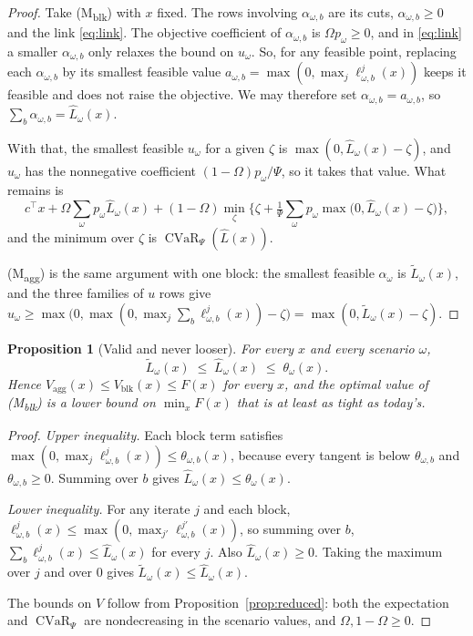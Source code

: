 \documentclass[11pt]{article}
\newtheorem{proposition}{Proposition}
\theoremstyle{remark}
\newcommand{\Lh}{\widehat{L}}
\newcommand{\Lt}{\widetilde{L}}
\newcommand{\CVaR}{\operatorname{CVaR}}
\begin{document}
\begin{proof}
Take (M\textsubscript{blk}) with $x$ fixed. The rows involving $\alpha_{\omega,b}$ are its cuts,
$\alpha_{\omega,b} \ge 0$ and the link \eqref{eq:link}. The objective coefficient of
$\alpha_{\omega,b}$ is $\Omega p_\omega \ge 0$, and in \eqref{eq:link} a smaller $\alpha_{\omega,b}$
only relaxes the bound on $u_\omega$. So, for any feasible point, replacing each $\alpha_{\omega,b}$
by its smallest feasible value $a_{\omega,b} = \max(0, \max_j \ell^j_{\omega,b}(x))$ keeps it
feasible and does not raise the objective. We may therefore set $\alpha_{\omega,b} = a_{\omega,b}$,
so $\sum_b \alpha_{\omega,b} = \Lh_\omega(x)$.

With that, the smallest feasible $u_\omega$ for a given $\zeta$ is
$\max(0, \Lh_\omega(x) - \zeta)$, and $u_\omega$ has the nonnegative coefficient
$(1-\Omega)p_\omega/\Psi$, so it takes that value. What remains is
\[
  c^\top x + \Omega\sum_\omega p_\omega \Lh_\omega(x)
  + (1-\Omega)\min_\zeta\Big\{\zeta + \tfrac1\Psi \sum_\omega p_\omega \max\big(0, \Lh_\omega(x)-\zeta\big)\Big\},
\]
and the minimum over $\zeta$ is $\CVaR_\Psi(\Lh(x))$.

(M\textsubscript{agg}) is the same argument with one block: the smallest feasible $\alpha_\omega$ is
$\Lt_\omega(x)$, and the three families of $u$ rows give
$u_\omega \ge \max\big(0, \max(0, \max_j \sum_b \ell^j_{\omega,b}(x)) - \zeta\big)
= \max(0, \Lt_\omega(x) - \zeta)$.
\end{proof}

\begin{proposition}[Valid and never looser]\label{prop:tight}
For every $x$ and every scenario $\omega$,
\begin{equation}
  \Lt_\omega(x) \;\le\; \Lh_\omega(x) \;\le\; \theta_\omega(x).
\end{equation}
Hence $V_{\text{agg}}(x) \le V_{\text{blk}}(x) \le F(x)$ for every $x$, and the optimal value of
(M\textsubscript{blk}) is a lower bound on $\min_x F(x)$ that is at least as tight as today's.
\end{proposition}

\begin{proof}
\emph{Upper inequality.} Each block term satisfies
$\max(0, \max_j \ell^j_{\omega,b}(x)) \le \theta_{\omega,b}(x)$, because every tangent is below
$\theta_{\omega,b}$ and $\theta_{\omega,b} \ge 0$. Summing over $b$ gives
$\Lh_\omega(x) \le \theta_\omega(x)$.

\emph{Lower inequality.} For any iterate $j$ and each block,
$\ell^j_{\omega,b}(x) \le \max(0, \max_{j'} \ell^{j'}_{\omega,b}(x))$, so summing over $b$,
$\sum_b \ell^j_{\omega,b}(x) \le \Lh_\omega(x)$ for every $j$. Also $\Lh_\omega(x) \ge 0$. Taking the
maximum over $j$ and over $0$ gives $\Lt_\omega(x) \le \Lh_\omega(x)$.

The bounds on $V$ follow from Proposition~\ref{prop:reduced}: both the expectation and
$\CVaR_\Psi$ are nondecreasing in the scenario values, and $\Omega, 1-\Omega \ge 0$.
\end{proof}
\end{document}
